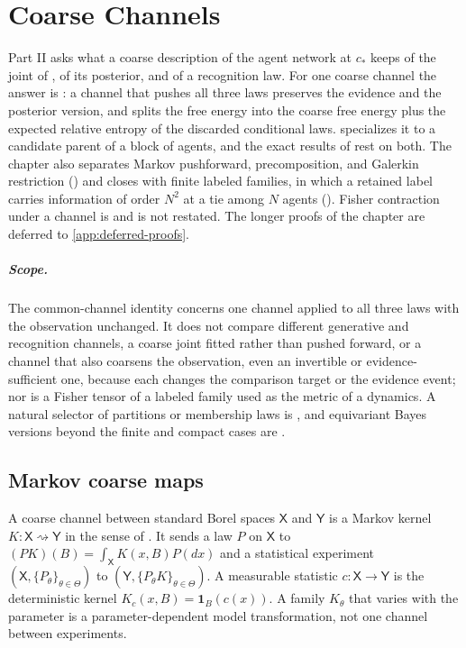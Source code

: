 \chapter{Coarse Channels}
\label{ch:coarsegraining}

Part II asks what a coarse description of the agent network at $c_*$ keeps of the joint of
, of its posterior, and of a recognition law. For one coarse channel the answer
is : a channel that pushes all three laws preserves the evidence and
the posterior version, and splits the free energy into the coarse free energy plus the expected
relative entropy of the discarded conditional laws. 
specializes it to a candidate parent of a block of agents, and the exact results of
rest on both. The chapter also separates Markov pushforward, precomposition, and Galerkin
restriction () and closes with finite labeled families, in which a
retained label carries information of order $N^2$ at a tie among $N$ agents
(). Fisher contraction under a channel is
 and is not restated. The longer proofs of the chapter are
deferred to \cref{app:deferred-proofs}.

\paragraph{Scope.} The common-channel identity concerns one channel applied to all three laws with
the observation unchanged. It does not compare different generative and recognition channels, a
coarse joint fitted rather than pushed forward, or a channel that also coarsens the observation, even
an invertible or evidence-sufficient one, because each changes the comparison target or the evidence
event; nor is a Fisher tensor of a labeled family used as the metric of a dynamics.
 A natural selector of partitions or membership laws is
, and equivariant Bayes versions beyond the finite and compact cases
are .

\section{Markov coarse maps}
\label{sec:cg-markov-category}

\label{eq:cg-markov-pushforward}
A coarse channel between standard Borel spaces $\mathsf X$ and $\mathsf Y$ is a Markov kernel
$K:\mathsf X\rightsquigarrow\mathsf Y$ in the sense of . It sends a law
$P$ on $\mathsf X$ to $(PK)(B)=\int_{\mathsf X}K(x,B)P(dx)$ and a statistical experiment
$(\mathsf X,\{P_\theta\}_{\theta\in\Theta})$ to $(\mathsf Y,\{P_\theta K\}_{\theta\in\Theta})$. A
measurable statistic $c:\mathsf X\to\mathsf Y$ is the deterministic kernel
$K_c(x,B)=\mathbf 1_B(c(x))$. A family $K_\theta$ that varies with the parameter is a
parameter-dependent model transformation, not one channel between experiments.

